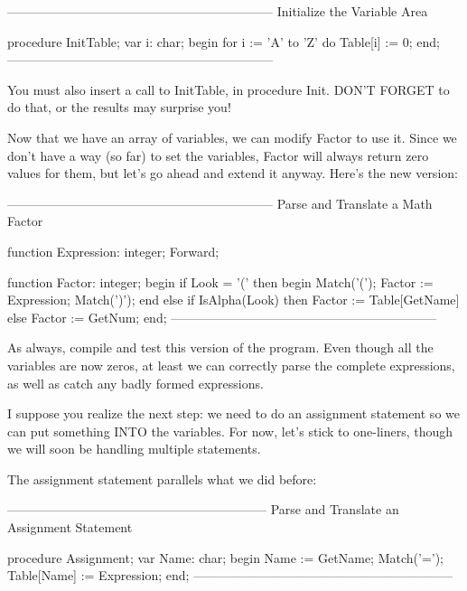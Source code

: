 \documentclass[float=false, crop=false]{standalone}
\begin{document}
\begin{code}
{---------------------------------------------------------------}
{ Initialize the Variable Area }

procedure InitTable;
var i: char;
begin
   for i := 'A' to 'Z' do
      Table[i] := 0;
end;
{---------------------------------------------------------------}
\end{code}

You must also insert a call to InitTable, in procedure Init. DON'T FORGET to do
that, or the results may surprise you!

Now that we have an array of variables, we can modify Factor to use it. Since we
don't have a way (so far) to set the variables, Factor will always return zero
values for them, but let's go ahead and extend it anyway. Here's the new
version:

\begin{code}
{---------------------------------------------------------------}
{ Parse and Translate a Math Factor }

function Expression: integer; Forward;

function Factor: integer;
begin
   if Look = '(' then begin
      Match('(');
      Factor := Expression;
      Match(')');
      end
   else if IsAlpha(Look) then
      Factor := Table[GetName]
   else
       Factor := GetNum;
end;
{---------------------------------------------------------------}
\end{code}

As always, compile and test this version of the program. Even though all the
variables are now zeros, at least we can correctly parse the complete
expressions, as well as catch any badly formed expressions.

I suppose you realize the next step: we need to do an assignment statement so we
can put something INTO the variables. For now, let's stick to one-liners, though
we will soon be handling multiple statements.

The assignment statement parallels what we did before:

\begin{code}
{--------------------------------------------------------------}
{ Parse and Translate an Assignment Statement }

procedure Assignment;
var Name: char;
begin
   Name := GetName;
   Match('=');
   Table[Name] := Expression;
end;
{--------------------------------------------------------------}
\end{code}
\end{document}
